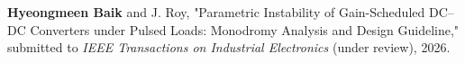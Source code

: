 \documentclass[a4paper,9pt]{extarticle}
\begin{document}
\medskip\noindent
\textbf{Hyeongmeen Baik} and J. Roy, "Parametric Instability of Gain-Scheduled DC--DC Converters under Pulsed Loads: Monodromy Analysis and Design Guideline," submitted to \textit{IEEE Transactions on Industrial Electronics} (under review), 2026.



\end{document}
